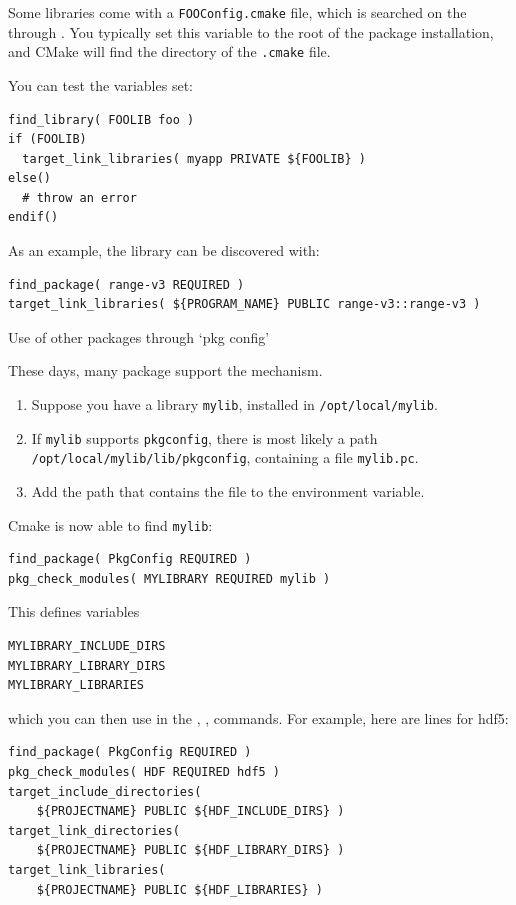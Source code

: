 Some libraries come with a \lstinline[language=shell]{FOOConfig.cmake} file,
which is searched on the 
through .
You typically set this variable to the root of the package installation,
and CMake will find the directory of the \lstinline[language=shell]{.cmake} file.

You can test the variables set:
\begin{lstlisting}
find_library( FOOLIB foo )
if (FOOLIB)
  target_link_libraries( myapp PRIVATE ${FOOLIB} )
else()
  # throw an error
endif()
\end{lstlisting}

As an example, the  library can be discovered with:

\begin{lstlisting}
find_package( range-v3 REQUIRED )
target_link_libraries( ${PROGRAM_NAME} PUBLIC range-v3::range-v3 )
\end{lstlisting}

 {Use of other packages through `pkg config'}

These days, many package support the  mechanism.
\begin{enumerate}
\item Suppose you have a library \lstinline[language=shell]{mylib},
  installed in \lstinline[language=shell]{/opt/local/mylib}.
\item If \lstinline[language=shell]{mylib} supports \lstinline[language=shell]{pkgconfig},
  there is most likely a path
  \lstinline[language=shell]{/opt/local/mylib/lib/pkgconfig}, containing a file \lstinline[language=shell]{mylib.pc}.
\item Add the path that contains the  file to the
   environment variable.
\end{enumerate}
Cmake is now able to find \lstinline[language=shell]{mylib}:
\begin{lstlisting}
find_package( PkgConfig REQUIRED )
pkg_check_modules( MYLIBRARY REQUIRED mylib )
\end{lstlisting}

This defines variables
\begin{lstlisting}[language=shell]
MYLIBRARY_INCLUDE_DIRS
MYLIBRARY_LIBRARY_DIRS
MYLIBRARY_LIBRARIES
\end{lstlisting}
which you can then use in the
,
,
commands.
For example, here are lines for hdf5:
\begin{lstlisting}
find_package( PkgConfig REQUIRED )
pkg_check_modules( HDF REQUIRED hdf5 )
target_include_directories(
    ${PROJECTNAME} PUBLIC ${HDF_INCLUDE_DIRS} )
target_link_directories(
    ${PROJECTNAME} PUBLIC ${HDF_LIBRARY_DIRS} )
target_link_libraries(
    ${PROJECTNAME} PUBLIC ${HDF_LIBRARIES} )
\end{lstlisting}


